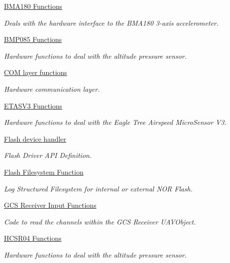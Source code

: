\begin{DoxyCompactItemize}
\hyperlink{group___p_i_o_s___b_m_a180}{\-B\-M\-A180 Functions}
\begin{DoxyCompactList}\small\item\em \-Deals with the hardware interface to the \-B\-M\-A180 3-\/axis accelerometer. \end{DoxyCompactList}\item 
\hyperlink{group___p_i_o_s___b_m_p085}{\-B\-M\-P085 Functions}
\begin{DoxyCompactList}\small\item\em \-Hardware functions to deal with the altitude pressure sensor. \end{DoxyCompactList}\item 
\hyperlink{group___p_i_o_s___c_o_m}{\-C\-O\-M layer functions}
\begin{DoxyCompactList}\small\item\em \-Hardware communication layer. \end{DoxyCompactList}\item 
\hyperlink{group___p_i_o_s___e_t_a_s_v3}{\-E\-T\-A\-S\-V3 Functions}
\begin{DoxyCompactList}\small\item\em \-Hardware functions to deal with the \-Eagle \-Tree \-Airspeed \-Micro\-Sensor \-V3. \end{DoxyCompactList}\item 
\hyperlink{group___p_i_o_s___f_l_a_s_h}{\-Flash device handler}
\begin{DoxyCompactList}\small\item\em \-Flash \-Driver \-A\-P\-I \-Definition. \end{DoxyCompactList}\item 
\hyperlink{group___p_i_o_s___f_l_a_s_h_f_s}{\-Flash Filesystem Function}
\begin{DoxyCompactList}\small\item\em \-Log \-Structured \-Filesystem for internal or external \-N\-O\-R \-Flash. \end{DoxyCompactList}\item 
\hyperlink{group___p_i_o_s___g_c_s_r_c_v_r}{\-G\-C\-S Receiver Input Functions}
\begin{DoxyCompactList}\small\item\em \-Code to read the channels within the \-G\-C\-S \-Receiver \-U\-A\-V\-Object. \end{DoxyCompactList}\item 
\hyperlink{group___p_i_o_s___h_c_s_r04}{\-H\-C\-S\-R04 Functions}
\begin{DoxyCompactList}\small\item\em \-Hardware functions to deal with the altitude pressure sensor. \end{DoxyCompactList}\item 

\end{DoxyCompactItemize}
